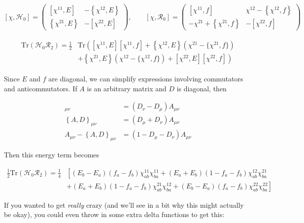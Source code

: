 \begin{equation}
\left[\chi, \mathcal{H}_0\right] = \left(\begin{array}{cc}
[\chi^{11},E] & -\left\{\chi^{12},E\right\} \\
\left\{\chi^{21},E\right\} & -[\chi^{22},E]
\end{array}\right), \qquad
\left[\chi, \mathcal{R}_0\right] = \left(\begin{array}{cc}
[\chi^{11},f] & \chi^{12}-\left\{\chi^{12},f\right\} \\
-\chi^{21}+\left\{\chi^{21},f\right\} & -[\chi^{22},f]
\end{array}\right)
\end{equation}

\begin{align}\label{eqn:H0R2}
\begin{aligned}
\mathrm{Tr}\left(\mathcal{H}_0\mathcal{R}_2\right) = \frac{1}{2}
&\mathrm{Tr} \left([\chi^{11},E][\chi^{11},f] + \left\{\chi^{12},E\right\}(\chi^{21}-\{\chi^{21},f\})\right. \\
&\left.+ \left\{\chi^{21},E\right\}(\chi^{12}-\{\chi^{12},f\}) + [\chi^{22},E][\chi^{22},f]\right)
\end{aligned}
\end{align}

Since $E$ and $f$ are diagonal, we can simplify expressions involving commutators and anticommutators. If $A$ is an arbitrary matrix and $D$ is diagonal, then

\begin{align}
[A,D]_{\mu\nu} &= (D_\nu-D_\mu)A_{\mu\nu} \\
\left\{A,D\right\}_{\mu\nu} &= (D_\mu+D_\nu)A_{\mu\nu} \\
A_{\mu\nu}-\left\{A,D\right\}_{\mu\nu} &= (1-D_\mu-D_\nu)A_{\mu\nu}
\end{align}

\noindent Then this energy term becomes

\begin{align}
\frac{1}{2}\mathrm{Tr}\left(\mathcal{H}_0\mathcal{R}_2\right) = \frac{1}{4}
& \left[(E_b-E_a)(f_a-f_b)\chi^{11}_{ab}\chi^{11}_{ba} + (E_a+E_b)(1-f_a-f_b)\chi^{12}_{ab}\chi^{21}_{ba}\right. \\
&\left.+ (E_a+E_b)(1-f_a-f_b)\chi^{21}_{ab}\chi^{12}_{ba} + (E_b-E_a)(f_a-f_b)\chi^{22}_{ab}\chi^{22}_{ba}\right]
\end{align}

\noindent If you wanted to get \textit{really} crazy (and we'll see in a bit why this might actually be okay), you could even throw in some extra delta functions to get this:

